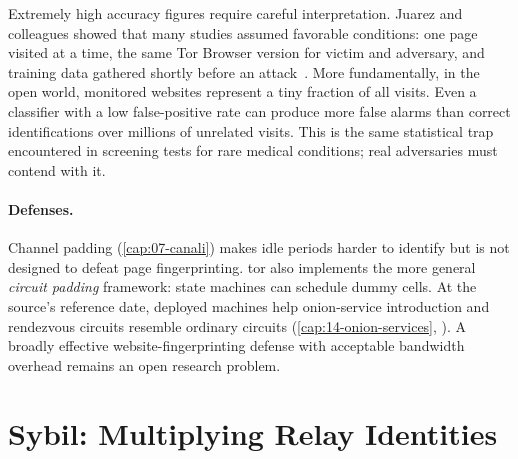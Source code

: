 \begin{approfondimento}
Extremely high accuracy figures require careful interpretation. Juarez and colleagues showed that many studies assumed favorable conditions: one page visited at a time, the same Tor Browser version for victim and adversary, and training data gathered shortly before an attack~\cite{juarez2014critical}. More fundamentally, in the open world, monitored websites represent a tiny fraction of all visits. Even a classifier with a low false-positive rate can produce more false alarms than correct identifications over millions of unrelated visits. This is the same statistical trap encountered in screening tests for rare medical conditions; real adversaries must contend with it.
\end{approfondimento}

\paragraph{Defenses.} Channel padding (\cref{cap:07-canali}) makes idle periods harder to identify but is not designed to defeat page fingerprinting. tor also implements the more general \emph{circuit padding} framework: state machines can schedule dummy cells. At the source's reference date, deployed machines help onion-service introduction and rendezvous circuits resemble ordinary circuits (\cref{cap:14-onion-services}, ). A broadly effective website-fingerprinting defense with acceptable bandwidth overhead remains an open research problem.

\section{Sybil: Multiplying Relay Identities}\label{sec:att-sybil}


